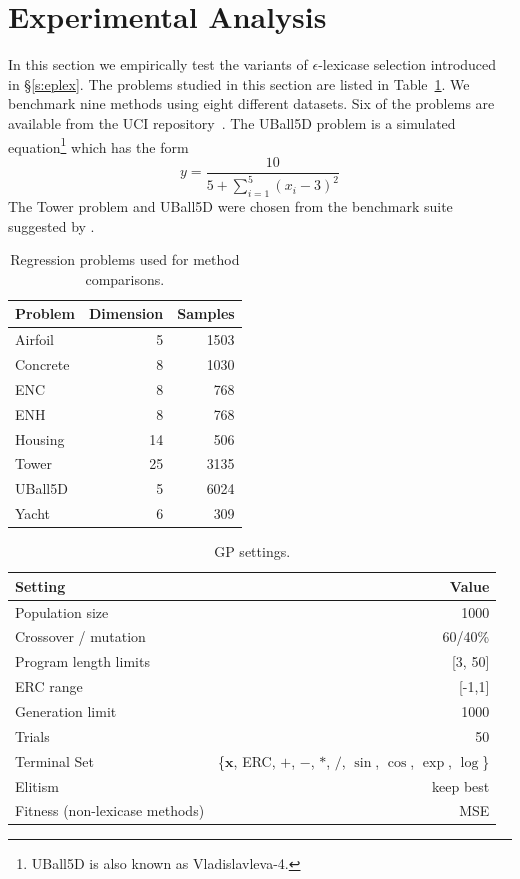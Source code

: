 \documentclass[twoside]{article}
\begin{document}
\section{Experimental Analysis} \label{s:exp}
In this section we empirically test the variants of $\epsilon$-lexicase selection introduced in \S\ref{s:eplex}. The problems studied in this section are listed in Table~\ref{tbl:regression}. We benchmark nine methods using eight different datasets. Six of the problems are available from the UCI repository~\citep{lichman_uci_2013}. The UBall5D problem is a simulated equation\footnote{UBall5D is also known as Vladislavleva-4.} which has the form \[ y = \frac{10}{5+\sum_{i=1}^5{(x_i-3)^2}}\] The Tower problem and UBall5D were chosen from the benchmark suite suggested by \cite{white_better_2012}. 
\begin{table}
\centering
\scriptsize
\caption{Regression problems used for method comparisons.}\label{tbl:regression}
\begin{tabularx}{0.5\columnwidth}{X r r } \toprule
Problem & Dimension & Samples \\ \midrule
Airfoil & 5	& 1503 \\
Concrete	& 	8	& 1030	\\
ENC & 8 & 768 \\
ENH & 8 & 768 \\
Housing & 14 & 506 \\
Tower & 25 & 3135 \\
UBall5D & 5 & 6024 \\ 
Yacht	& 6	&	309	\\ \midrule
\end{tabularx}
\end{table}

\begin{table}
\centering
\scriptsize
\caption{GP settings.}\label{tbl:symreg_settings}
\begin{tabular}{lr} \toprule
Setting& Value \\ \midrule
Population size & 1000 \\
Crossover / mutation & 60/40\% \\
Program length limits & [3, 50] \\ 
ERC range & [-1,1] \\
Generation limit & 1000 \\
Trials & 50 \\
Terminal Set & \{$\mathbf{x}$, ERC, $+$, $-$, $*$, $/$, $\sin$, $\cos$, $\exp$, $\log$\}\\
Elitism & keep best \\
Fitness (non-lexicase methods) & MSE \\ \bottomrule
\end{tabular}
\end{table}
\end{document}
